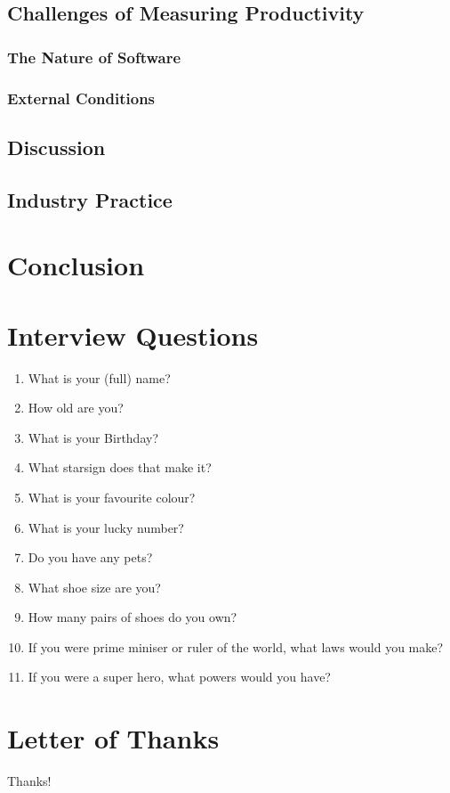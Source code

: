 \documentclass[letterpaper, 12pt]{report}
\begin{document}
\section{Challenges of Measuring Productivity}
\subsection{The Nature of Software}
\subsection{External Conditions}

\section{Discussion}

\section{Industry Practice}

\chapter{Conclusion}

\appendix

\chapter{Interview Questions}
\begin{enumerate}[leftmargin=*]
	\item What is your (full) name?
	\item How old are you?
	\item What is your Birthday?
	\item What starsign does that make it?
	\item What is your favourite colour?
	\item What is your lucky number?
	\item Do you have any pets?
	\item What shoe size are you?
	\item How many pairs of shoes do you own?
	\item If you were prime miniser or ruler of the world, what laws would you make?
	\item If you were a super hero, what powers would you have?
\end{enumerate}

\chapter{Letter of Thanks}
Thanks!

\nocite{*}
% 
% 
\printbibliography
\end{document}
